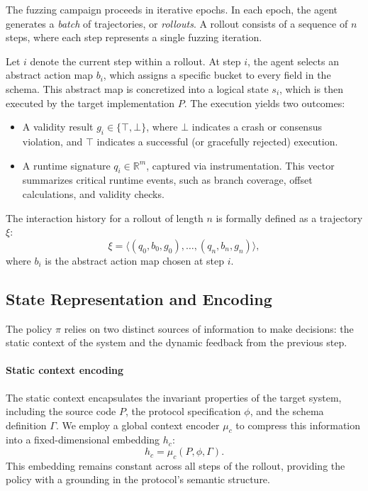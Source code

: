 The fuzzing campaign proceeds in iterative epochs. In each epoch, the agent generates a \textit{batch} of trajectories, or \textit{rollouts}. A rollout consists of a sequence of $n$ steps, where each step represents a single fuzzing iteration.

Let $i$ denote the current step within a rollout. At step $i$, the agent selects an abstract action map $b_i$, which assigns a specific bucket to every field in the schema. This abstract map is concretized into a logical state $s_i$, which is then executed by the target implementation $P$. The execution yields two outcomes:
\begin{itemize}
    \item A validity result $g_i \in \{ \top, \bot \}$, where $\bot$ indicates a crash or consensus violation, and $\top$ indicates a successful (or gracefully rejected) execution.
    \item A runtime signature $q_i \in \mathbb{R}^m$, captured via instrumentation. This vector summarizes critical runtime events, such as branch coverage, offset calculations, and validity checks.
\end{itemize}

The interaction history for a rollout of length $n$ is formally defined as a trajectory $\xi$:
\[
    \xi = \Big\langle (q_0, b_0, g_0), \dots, (q_n, b_n, g_n) \Big\rangle,
\]
where $b_i$ is the abstract action map chosen at step $i$.

\subsection{State Representation and Encoding}
\label{sec:encoding}

The policy $\pi$ relies on two distinct sources of information to make decisions: the static context of the system and the dynamic feedback from the previous step.

\paragraph{Static context encoding}
The static context encapsulates the invariant properties of the target system, including the source code $P$, the protocol specification $\phi$, and the schema definition $\Gamma$. We employ a global context encoder $\mu_c$ to compress this information into a fixed-dimensional embedding $h_c$:
\[
    h_c = \mu_c(P, \phi, \Gamma).
\]
This embedding remains constant across all steps of the rollout, providing the policy with a grounding in the protocol's semantic structure.

